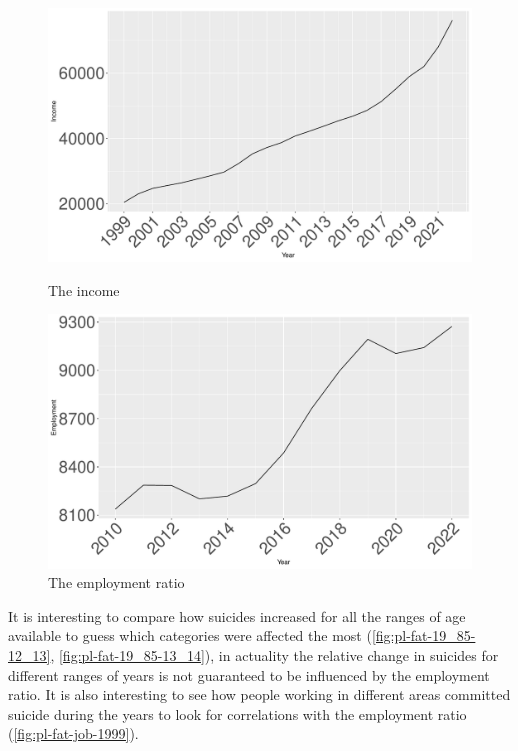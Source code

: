 \documentclass{article}
\begin{document}
\begin{figure}[H]
	\centering
	\begin{minipage}{0.45\textwidth}
		\includegraphics[width=\textwidth]{imgs/income.pdf}
		\caption{The income}
		\label{fig:income}
	\end{minipage}
	\hfill
	\begin{minipage}{0.45\textwidth}
		\includegraphics[width=\textwidth]{imgs/employment.pdf}
		\caption{The employment ratio}
		\label{fig:employment}
	\end{minipage}
\end{figure}

It is interesting to compare how suicides increased for all the ranges of age available to 
guess which categories were affected the most (\ref{fig:pl-fat-19_85-12_13}, \ref{fig:pl-fat-19_85-13_14}),
in actuality the relative change in suicides for different ranges of years is not guaranteed 
to be influenced by the employment ratio.
It is also interesting to see how people working in different areas committed suicide during the years
to look for correlations with the employment ratio (\ref{fig:pl-fat-job-1999}).
%
%
\end{document}
